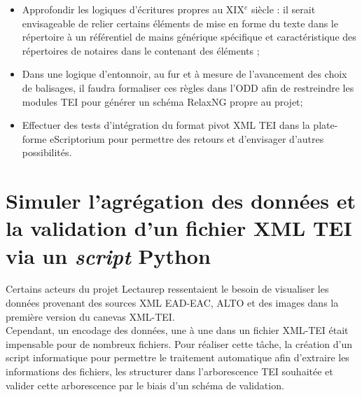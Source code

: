 \begin{itemize}
    Par exemple, une colonne correspond au type d'acte, la suivante au prix, la suivante au client etc. Dans un deuxième temps, réunir les blocs horizontaux similaires. Ce qui ne constitue pas une tâche évidente dans le cadre des répertoires de notaires où les écritures peuvent parfois déborder des colonnes ou prendre de la place sur plusieurs lignes. Toujours est-il que des outils existent comme Grobid\footnote{Grobid documentation, URL: \url{https://grobid.readthedocs.io/en/latest/Introduction/}} (\textit{GeneRation Of BIbliographic Data}) pour extraire des informations sur la structure d'un document, parser et restructurer ces informations dans un format XML-TEI;\\
    \item Approfondir les logiques d'écritures propres au XIX$^e$ siècle : il serait envisageable de relier certains éléments de mise en forme du texte dans le répertoire à un référentiel de mains générique spécifique et caractéristique des répertoires de notaires dans le  contenant des éléments ;\\
    \item Dans une logique d'entonnoir, au fur et à mesure de l'avancement des choix de balisages, il faudra formaliser ces règles dans l'ODD afin de restreindre les modules TEI pour générer un schéma RelaxNG propre au projet;\\
    \item Effectuer des tests d'intégration du format pivot XML TEI dans la plate-forme eScriptorium pour permettre des retours et d'envisager d'autres possibilités. 
\end{itemize}
\newpage
\section{Simuler l'agrégation des données et la validation d'un fichier XML TEI via un \textit{script} Python}\label{generator-lecto-dev}

Certains acteurs du projet Lectaurep ressentaient le besoin de visualiser les données provenant des sources XML EAD-EAC, ALTO et des images dans la première version du canevas XML-TEI.\\

Cependant, un encodage  des données, une à une dans un fichier XML-TEI était impensable pour de nombreux fichiers. Pour réaliser cette tâche, la création d'un script informatique pour permettre le traitement automatique afin d'extraire les informations des fichiers, les structurer dans l'arborescence TEI souhaitée et valider cette arborescence par le biais d'un schéma de validation.\\

